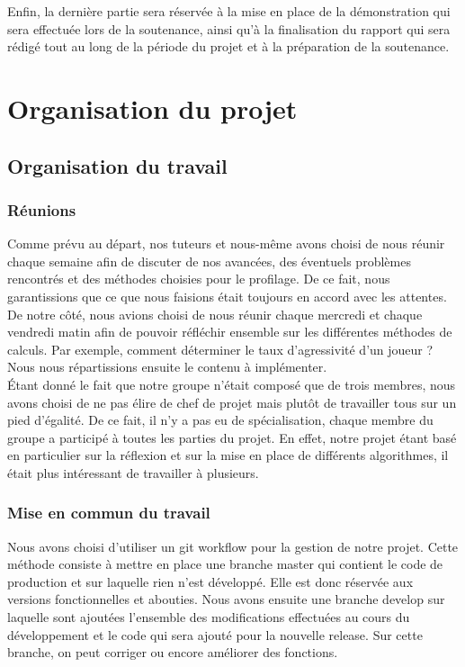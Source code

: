 \documentclass{report}
\begin{document}
Enfin, la dernière partie sera réservée à la mise en place de la démonstration qui sera effectuée lors de la soutenance, ainsi qu'à la finalisation du rapport qui sera rédigé tout au long de la période du projet et à la préparation de la soutenance.\par

\chapter{Organisation du projet}



\section{Organisation du travail}

\subsection{Réunions}
\hspace{0.5cm}Comme prévu au départ, nos tuteurs et nous-même avons choisi de nous réunir chaque semaine afin de discuter de nos avancées, des éventuels problèmes rencontrés et des méthodes choisies pour le profilage. De ce fait, nous garantissions que ce que nous faisions était toujours en accord avec les attentes.\\

De notre côté, nous avions choisi de nous réunir chaque mercredi et chaque vendredi matin afin de pouvoir réfléchir ensemble sur les différentes méthodes de calculs. Par exemple, comment déterminer le taux d'agressivité d'un joueur ? Nous nous répartissions ensuite le contenu à implémenter.\\

Étant donné le fait que notre groupe n'était composé que de trois membres, nous avons choisi de ne pas élire de chef de projet mais plutôt de travailler tous sur un pied d'égalité. De ce fait, il n'y a pas eu de spécialisation, chaque membre du groupe a participé à toutes les parties du projet. En effet, notre projet étant basé en particulier sur la réflexion et sur la mise en place de différents algorithmes, il était plus intéressant de travailler à plusieurs.\par

\subsection{Mise en commun du travail}
\hspace{0.5cm}Nous avons choisi d'utiliser un git workflow pour la gestion de notre projet. Cette méthode consiste à mettre en place une branche master qui contient le code de production et sur laquelle rien n'est développé. Elle est donc réservée aux versions fonctionnelles et abouties.
Nous avons ensuite une branche develop sur laquelle sont ajoutées l'ensemble des modifications effectuées au cours du développement et le code qui sera ajouté pour la nouvelle release. Sur cette branche, on peut corriger ou encore améliorer des fonctions. \\
\end{document}
